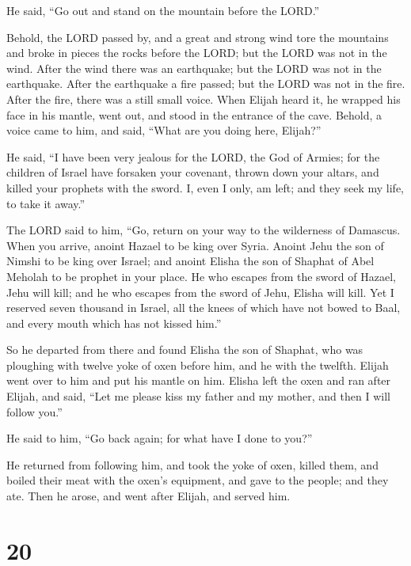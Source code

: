  He said, ``Go out and stand on the mountain before the
LORD.''

Behold, the LORD passed by, and a great and strong wind tore the
mountains and broke in pieces the rocks before the LORD; but the LORD
was not in the wind. After the wind there was an earthquake; but the
LORD was not in the earthquake.  After the earthquake a
fire passed; but the LORD was not in the fire. After the fire, there was
a still small voice.  When Elijah heard it, he wrapped
his face in his mantle, went out, and stood in the entrance of the cave.
Behold, a voice came to him, and said, ``What are you doing here,
Elijah?''

 He said, ``I have been very jealous for the LORD, the
God of Armies; for the children of Israel have forsaken your covenant,
thrown down your altars, and killed your prophets with the sword. I,
even I only, am left; and they seek my life, to take it away.''

 The LORD said to him, ``Go, return on your way to the
wilderness of Damascus. When you arrive, anoint Hazael to be king over
Syria.  Anoint Jehu the son of Nimshi to be king over
Israel; and anoint Elisha the son of Shaphat of Abel Meholah to be
prophet in your place.  He who escapes from the sword of
Hazael, Jehu will kill; and he who escapes from the sword of Jehu,
Elisha will kill.  Yet I reserved seven thousand in
Israel, all the knees of which have not bowed to Baal, and every mouth
which has not kissed him.''

 So he departed from there and found Elisha the son of
Shaphat, who was ploughing with twelve yoke of oxen before him, and he
with the twelfth. Elijah went over to him and put his mantle on him.
 Elisha left the oxen and ran after Elijah, and said,
``Let me please kiss my father and my mother, and then I will follow
you.''

He said to him, ``Go back again; for what have I done to you?''

 He returned from following him, and took the yoke of
oxen, killed them, and boiled their meat with the oxen's equipment, and
gave to the people; and they ate. Then he arose, and went after Elijah,
and served him.

\hypertarget{section-19}{%
\section{20}\label{section-19}}

